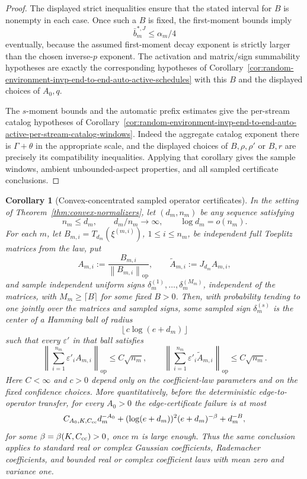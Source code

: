 \documentclass[11pt]{amsart}
\numberwithin{equation}{section}
\newtheorem{corollary}[theorem]{Corollary}
\theoremstyle{definition}
\theoremstyle{remark}
\newcommand{\op}{\mathrm{op}}
\newcommand{\norm}[1]{\left\lVert #1\right\rVert}
\newcommand{\eps}{\varepsilon}
\begin{document}
\begin{proof}
The displayed strict inequalities ensure that the stated interval for \(B\) is
nonempty in each case.  Once such a \(B\) is fixed, the first-moment bounds imply
\[
  \bar b_m^{*,J}\le \alpha_m/4
\]
eventually, because the assumed first-moment decay exponent is strictly larger
than the chosen inverse-\(p\) exponent.  The activation and matrix/sign
summability hypotheses are exactly the corresponding hypotheses of
Corollary~\ref{cor:random-environment-invp-end-to-end-auto-active-schedules}
with this \(B\) and the displayed choices of \(A_0,q\).

The \(s\)-moment bounds and the automatic prefix estimates give the per-stream
catalog hypotheses of
Corollary~\ref{cor:random-environment-invp-end-to-end-auto-active-per-stream-catalog-windows}.
Indeed the aggregate catalog exponent there is \(\Gamma+\theta\) in the
appropriate scale, and the displayed choices of \(B,\rho,\rho'\) or \(B,r\)
are precisely its compatibility inequalities.  Applying that corollary gives
the sample windows, ambient unbounded-aspect properties, and all sampled
certificate conclusions.
\end{proof}

\begin{corollary}[Convex-concentrated sampled operator certificates]
\label{cor:convex-normalizers-sampled-operator}
In the setting of Theorem~\ref{thm:convex-normalizers}, let
\((d_m,n_m)\) be any sequence satisfying
\[
  n_m\le d_m,\qquad d_m/n_m\to\infty,\qquad \log d_m=o(n_m).
\]
For each \(m\), let \(B_{m,i}=T_{d_m}(\xi^{(m,i)})\),
\(1\le i\le n_m\), be independent full Toeplitz matrices from the law, put
\[
  A_{m,i}:=\frac{B_{m,i}}{\norm{B_{m,i}}_{\op}},
  \qquad
  \widetilde A_{m,i}:=J_{d_m}A_{m,i},
\]
and sample independent uniform signs
\(\delta_m^{(1)},\ldots,\delta_m^{(M_m)}\), independent of the matrices, with
\(M_m\ge \lceil B\rceil\) for some fixed \(B>0\).  Then, with probability
tending to one jointly over the matrices and sampled signs, some sampled sign
\(\delta_m^{(s)}\) is the center of a Hamming ball of radius
\[
  \left\lfloor c\log(e+d_m)\right\rfloor
\]
such that every \(\eps'\) in that ball satisfies
\[
  \left\|\sum_{i=1}^{n_m}\eps'_iA_{m,i}\right\|_{\op}
  \le C\sqrt{n_m},
  \qquad
  \left\|\sum_{i=1}^{n_m}\eps'_i\widetilde A_{m,i}\right\|_{\op}
  \le C\sqrt{n_m}.
\]
Here \(C<\infty\) and \(c>0\) depend only on the coefficient-law parameters and
on the fixed confidence choices.  More quantitatively, before the deterministic
edge-to-operator transfer, for every \(A_0>0\) the edge-certificate failure is
at most
\[
  C_{A_0,K,C_{\rm cc}}d_m^{-A_0}
  +(\log(e+d_m))^2(e+d_m)^{-\beta}
  +d_m^{-B},
\]
for some \(\beta=\beta(K,C_{\rm cc})>0\), once \(m\) is large enough.  Thus the
same conclusion applies to standard real or complex Gaussian coefficients,
Rademacher coefficients, and bounded real or complex coefficient laws with mean
zero and variance one.
\end{corollary}
\end{document}
